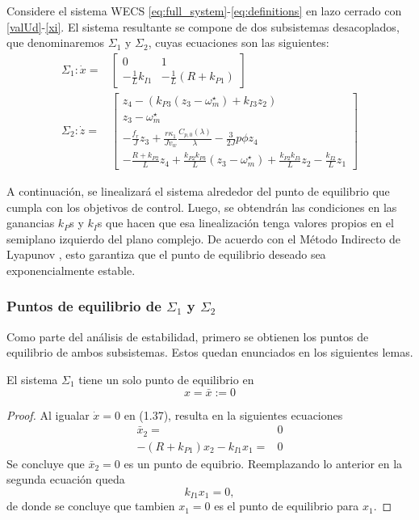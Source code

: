 \begin{lemma}\label{lem:wecs}
    Considere el sistema WECS \eqref{eq:full_system}-\eqref{eq:definitions} en lazo cerrado con \eqref{valUd}-\eqref{xi}. El sistema 
    resultante se compone de dos subsistemas desacoplados, que denominaremos $\Sigma_1$ y $\Sigma_2$, 
    cuyas ecuaciones son las siguientes:
    \begin{align*}
        \Sigma_1: \dot x= & \begin{bmatrix}0&1\\  -\frac{1}{L}k_{I1} & -\frac{1}{L}(R+k_{P1}) 
            \end{bmatrix}\\
        \Sigma_2: \dot z=& \begin{bmatrix}
            z_4 - (k_{P3}(z_3 - \omega^\star_m) + k_{I3}z_2) \\
            z_3 - \omega^\star_m \\
            -\frac{f_r}{J}z_3 + \frac{r\kappa_1}{Jv_w}\frac{C_{p,0}(\lambda)}{\lambda} - \frac{3}{2J}p\phi z_4 \\
            -\frac{R+k_{P2}}{L}z_4 + \frac{k_{P2}k_{P3}}{L}(z_3 - \omega^\star_m) + \frac{k_{P2}k_{I3}}{L}z_2 - \frac{k_{I2}}{L}z_1
            \end{bmatrix}
    \end{align*}
    \tripletriang
\end{lemma}

A continuación, se linealizará el sistema alrededor del punto de equilibrio que
cumpla con los objetivos de control. Luego, se obtendrán las condiciones en las
ganancias $k_P$s y $k_I$s que hacen que esa linealización tenga valores propios en
el semiplano izquierdo del plano complejo. De acuerdo con el Método Indirecto de
Lyapunov \cite{khalil2002}, esto garantiza que el punto de equilibrio
deseado sea exponencialmente estable.


\subsubsection*{Puntos de equilibrio de $\Sigma_1$ y $\Sigma_2$}

Como parte del análisis de estabilidad, primero se obtienen los puntos de equilibrio de ambos subsistemas. 
Estos quedan enunciados en los siguientes lemas.

\begin{lemma}
    El sistema $\Sigma_1$ tiene un solo punto de equilibrio en $$x=\bar{x}:=0$$
    \tripletriang

    \begin{proof}
        Al igualar $\dot x=0$ en (1.37), resulta en la siguientes ecuaciones
        \begin{align*}
            \bar{x}_2=&0\\
            -(R+k_{P1})x_2-k_{I1}x_1  =&0 	
        \end{align*}
        Se concluye que $\bar{x}_2=0$ es un punto de equibrio. Reemplazando lo anterior en la segunda ecuación queda
        $$k_{I1}x_1  =0,$$
        de donde se concluye que  tambien  $x_1=0$ es el punto de equilibrio para $x_1$.
    \end{proof}
\end{lemma}

